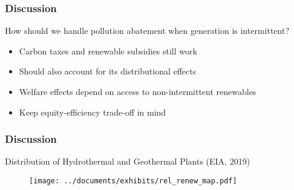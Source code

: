 \documentclass[aspectratio=169]{beamer}
\begin{document}
%


\begin{frame}
\frametitle{Discussion}

\begin{block}{How should we handle pollution abatement when generation is intermittent?}
	\begin{itemize}
		\setlength\itemsep{0.5em}
		\item Carbon taxes and renewable subsidies still work
		\item Should also account for its distributional effects
		\item Welfare effects depend on access to non-intermittent renewables
		\item Keep equity-efficiency trade-off in mind
	\end{itemize}
\end{block}
\end{frame}


\begin{frame}
\frametitle{Discussion}

\begin{block}{\centering Distribution of Hydrothermal and Geothermal Plants (EIA, 2019)}
\end{block}

\begin{figure}
	\vspace{-1em}
	\texttt{[image: ../documents/exhibits/rel\_renew\_map.pdf]} 
\end{figure}

\end{frame}
\end{document}
